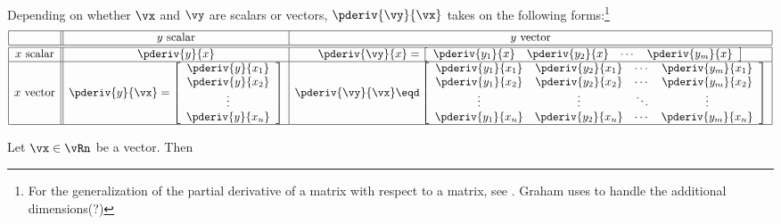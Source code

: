 \begin{remark}
Depending on whether $\vx$ and $\vy$ are scalars or vectors,
$\pderiv{\vy}{\vx}$ takes on the following
forms:\footnote{%
  For the generalization of the partial derivative of a matrix
  with respect to a matrix, see
  .
  Graham uses  to handle the additional dimensions(?)
  }
\[
\begin{array}{|c||c|c|}
   \hline
         & \text{$y$ scalar} & \text{$y$ vector}
   \\
   \hline
   \hline
   \text{$x$ scalar}
   &
   \pderiv{y}{x}
   &
   \pderiv{\vy}{x} =
   \left[\begin{array}{*{4}{c}}
         \pderiv{y_1}{x} & \pderiv{y_2}{x} & \cdots & \pderiv{y_m}{x}
      \end{array}\right]
   \\ \hline
   \text{$x$ vector}
   &
   \pderiv{y}{\vx }=
   \left[\begin{array}{c}
         \pderiv{y}{x_1} \\
         \pderiv{y}{x_2} \\
         \vdots          \\
         \pderiv{y}{x_n}
      \end{array}\right]
   &
   \pderiv{\vy}{\vx} \eqd
   \left[\begin{array}{ccccc}
         \pderiv{y_1}{x_1} & \pderiv{y_2}{x_1} & \cdots & \pderiv{y_m}{x_1} \\
         \pderiv{y_1}{x_2} & \pderiv{y_2}{x_2} & \cdots & \pderiv{y_m}{x_2} \\
         \vdots            & \vdots            & \ddots & \vdots            \\
         \pderiv{y_1}{x_n} & \pderiv{y_2}{x_n} & \cdots & \pderiv{y_m}{x_n}
      \end{array}\right]
   \\
   \hline
  \end{array}
\]
\end{remark}


\begin{lemma}
\label{lem:mc_pxx}
Let $\vx\in\vRn$ be a vector. Then
\end{lemma}

